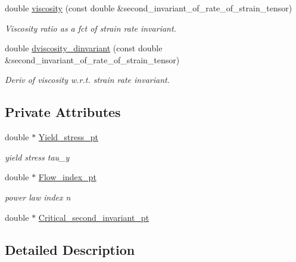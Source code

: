 \begin{DoxyCompactItemize}
\item 
double \hyperlink{classoomph_1_1HerschelBulkleyTanMilRegWithBlendingConstitutiveEquation_acd0153be4f3e8177b21c5fe0f9a31b11}{viscosity} (const double \&second\+\_\+invariant\+\_\+of\+\_\+rate\+\_\+of\+\_\+strain\+\_\+tensor)
\begin{DoxyCompactList}\small\item\em Viscosity ratio as a fct of strain rate invariant. \end{DoxyCompactList}\item 
double \hyperlink{classoomph_1_1HerschelBulkleyTanMilRegWithBlendingConstitutiveEquation_a62a903bc649a75dd1042923e624e2ea4}{dviscosity\+\_\+dinvariant} (const double \&second\+\_\+invariant\+\_\+of\+\_\+rate\+\_\+of\+\_\+strain\+\_\+tensor)
\begin{DoxyCompactList}\small\item\em Deriv of viscosity w.\+r.\+t. strain rate invariant. \end{DoxyCompactList}\end{DoxyCompactItemize}
\subsection*{Private Attributes}
\begin{DoxyCompactItemize}
\item 
double $\ast$ \hyperlink{classoomph_1_1HerschelBulkleyTanMilRegWithBlendingConstitutiveEquation_ae1cc26fc86dfffdc1b38910aa8dfc6d9}{Yield\+\_\+stress\+\_\+pt}
\begin{DoxyCompactList}\small\item\em yield stress tau\+\_\+y \end{DoxyCompactList}\item 
double $\ast$ \hyperlink{classoomph_1_1HerschelBulkleyTanMilRegWithBlendingConstitutiveEquation_a2e1af77859cb590e608fd0d47d5ce366}{Flow\+\_\+index\+\_\+pt}
\begin{DoxyCompactList}\small\item\em power law index n \end{DoxyCompactList}\item 
double $\ast$ \hyperlink{classoomph_1_1HerschelBulkleyTanMilRegWithBlendingConstitutiveEquation_a2fcbea7454274274c607039540a3da49}{Critical\+\_\+second\+\_\+invariant\+\_\+pt}
\end{DoxyCompactItemize}


\subsection{Detailed Description}
